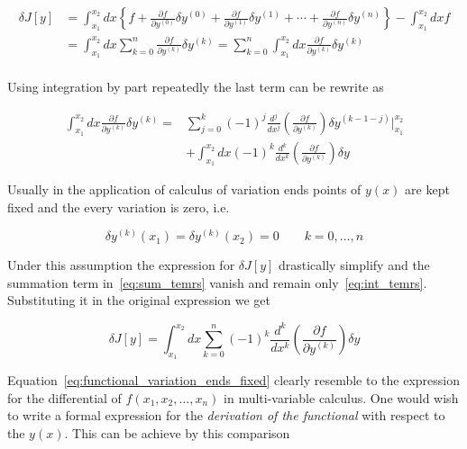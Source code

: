 \begin{align*}
  \delta J[y]
  &=\int_{x_1}^{x_2} dx \left\{ f +
    \frac{\partial f}{\partial y^{(0)}} \delta y^{(0)} +
    \frac{\partial f}{\partial y^{(1)}} \delta y^{(1)} + \cdots +
    \frac{\partial f}{\partial y^{(n)}} \delta y^{(n)}
    \right\} - \int_{x_1}^{x_2} dx f \\
  &=\int_{x_1}^{x_2} dx
    \sum_{k = 0}^{n} \frac{\partial f}{\partial y^{(k)}} \delta y^{(k)}
   =\sum_{k = 0}^{n}
    \int_{x_1}^{x_2} dx \frac{\partial f}{\partial y^{(k)}} \delta y^{(k)} \\
\end{align*}

Using integration by part repeatedly the last term can be rewrite as

\begin{align}
  \label{eq:sum_temrs}
  \int_{x_1}^{x_2} dx \frac{\partial f}{\partial y^{(k)}} \delta y^{(k)} =
  & \sum_{j=0}^{k} {(-1)}^j \frac{d^j}{dx^j}
  \left( \frac{\partial f}{\partial y^{(k)}} \right) \delta y^{(k-1-j)}
  \Big|_{x_1}^{x_2} \\
  \label{eq:int_temrs}
  & + \int_{x_1}^{x_2} dx {(-1)}^k \frac{d^k}{dx^k}
  \left( \frac{\partial f}{\partial y^{(k)}}\right) \delta y
\end{align}

Usually in the application of calculus of variation ends points of $y(x)$ are
kept fixed and the every variation is zero, i.e.

\begin{equation} \label{eq:fixed_ends}
  \delta y^{(k)}(x_1) = \delta y^{(k)}(x_2) = 0  \qquad k = 0, \ldots, n
\end{equation}

Under this assumption the expression for $\delta J[y]$ drastically simplify and
the summation term in~\eqref{eq:sum_temrs} vanish and remain
only~\eqref{eq:int_temrs}. Substituting it in the original expression we get

\begin{equation} \label{eq:functional_variation_ends_fixed}
  \delta J[y] = \int_{x_1}^{x_2} dx \sum_{k = 0}^{n} {(-1)}^k \frac{d^k}{dx^k}
  \left( \frac{\partial f}{\partial y^{(k)}}\right) \delta y
\end{equation}

Equation~\eqref{eq:functional_variation_ends_fixed} clearly resemble to the
expression for the differential of $f(x_1, x_2, \ldots, x_n)$ in multi-variable
calculus. One would wish to write a formal expression for the \emph{derivation
of the functional} with respect to the $y(x)$. This can be achieve by this
comparison

